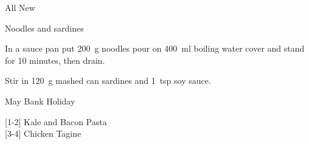 \begin{menu}{All New}
\begin{recipe}{1}{Noodles and sardines}
\begin{ingredients}
		\end{ingredients}
	
    \begin{instructions}
    \item 
      In a sauce pan
      put
      200~g  noodles
      pour on
      400~ml  boiling water
      cover and stand for 10 minutes, then drain.
    \item 
        Stir in
        120~g mashed can sardines
        and
        1~tsp  soy sauce.

    
    \end{instructions}
    \end{recipe}%
  
    \clearpage
    \end{menu}
	
		\begin{menu}{May Bank Holiday}
    
    \begin{recipelist}
    
        {\scriptsize[1-2]} Kale and Bacon Pasta\\
        {\scriptsize[3-4]} Chicken Tagine\\
    \end{recipelist}%
    \begin{recipelist}
    
    \end{recipelist}\par%
  

\end{menu}
